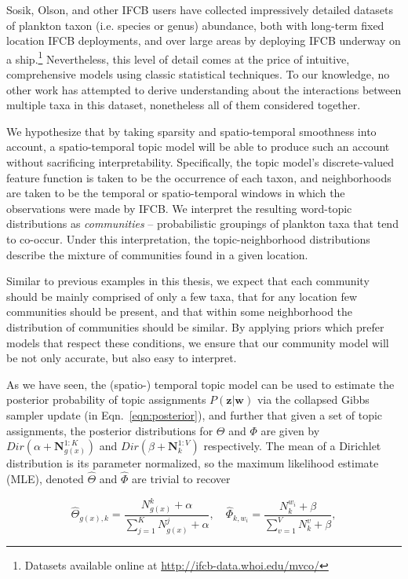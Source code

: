 Sosik, Olson, and other IFCB users have collected impressively detailed datasets of plankton taxon (i.e. species or genus) abundance, both with long-term fixed location IFCB deployments, and over large areas by deploying IFCB underway on a ship.\footnote{Datasets available online at \url{http://ifcb-data.whoi.edu/mvco/}}
Nevertheless, this level of detail comes at the price of intuitive, comprehensive models using classic statistical techniques. To our knowledge, no other work has attempted to derive understanding about the interactions between multiple taxa in this dataset, nonetheless all of them considered together.

We hypothesize that by taking sparsity and spatio-temporal smoothness into account, a spatio-temporal topic model will be able to produce such an account without sacrificing interpretability. Specifically, the topic model's discrete-valued feature function is taken to be the occurrence of each taxon, and neighborhoods are taken to be the temporal or spatio-temporal windows in which the observations were made by IFCB. We interpret the resulting word-topic distributions as \emph{communities} -- probabilistic groupings of plankton taxa that tend to co-occur. Under this interpretation, the topic-neighborhood distributions describe the mixture of communities found in a given location.

Similar to previous examples in this thesis, we expect that each community should be mainly comprised of only a few taxa, that for any location few communities should be present, and that within some neighborhood the distribution of communities should be similar. By applying priors which prefer models that respect these conditions, we ensure that our community model will be not only accurate, but also easy to interpret.

As we have seen, the (spatio-) temporal topic model can be used to estimate the posterior probability of topic assignments $P(\boldsymbol{z} | \boldsymbol{w})$ via the collapsed Gibbs sampler update (in Eqn.~\ref{eqn:posterior}), and further that given a set of topic assignments, the posterior distributions for $\Theta$ and $\Phi$ are given by $Dir(\alpha + \boldsymbol{N}_{g(x)}^{1:K})$ and $Dir(\beta + \boldsymbol{N}_k^{1:V})$ respectively. The mean of a Dirichlet distribution is its parameter normalized, so the maximum likelihood estimate (MLE), denoted $\hat{\Theta}$ and $\hat{\Phi}$ are trivial to recover

\begin{equation} \label{eqn:mle_thetaphi}
\hat{\Theta}_{g(x), k} = \frac{N^k_{g(x)} + \alpha}{\sum_{j=1}^K N^j_{g(x)} + \alpha}, \quad
\hat{\Phi}_{k,w_i} = \frac{N^{w_i}_k + \beta}{\sum_{v=1}^V N^v_k + \beta},
\end{equation}

